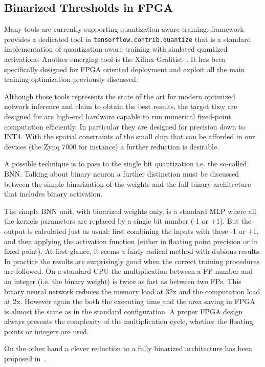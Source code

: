 \subsection*{Binarized Thresholds in FPGA}

Many tools are currently supporting quantization aware training. \Tensorflow framework provides a dedicated tool in \texttt{tensorflow.contrib.quantize} that is a standard implementation of quantization-aware training with simlated quantized activations. Another emerging tool is the Xilinx Grafitist~\cite{tqt2019}. It has been specifically designed for FPGA oriented deployment and exploit all the main training optimization previously discussed.

Although those tools represents the state of the art for modern optimized network inference and claim to obtain the best results, the target they are designed for are high-end hardware capable to run numerical fixed-point computation efficiently. 
In particular they are designed for precision down to INT4.
With the spatial constraints of the small chip that can be afforded in our devices (the Zynq 7000 for instance) a further reduction is desirable.

A possible technique is to pass to the single bit quantization i.e. the so-called \ac{BNN}.
Talking about binary neuron a further distinction must be discussed between the simple binarization of the weights and the full binary architecture that includes binary activation.

The simple BNN unit, with binarized weights only, is a standard MLP where all the kernels parameters are replaced by a single bit number (-1 or +1). But the output is calculated just as usual: first combining the inputs with these -1 or +1, and then applying the activation function (either in floating point precision or in fixed point). At first glance, it seems a fairly radical method with dubious results. In practice the results are surprisingly good when the correct training procedures are followed.
On a standard CPU the multiplication between a FP number and an integer (i.e. the binary weight) is twice as fast as between two FPs. This binary neural network reduces the memory load at 32x and the computation load at 2x. 
However again the both the executing time and the area saving in FPGA is almost the same as in the standard configuration. A proper FPGA design always presents the complexity of the multiplication cycle, whether the floating points or integers are used. 

On the other hand a clever reduction to a fully binarized architecture has been proposed in~\cite{courbariaux2016binarized}.


